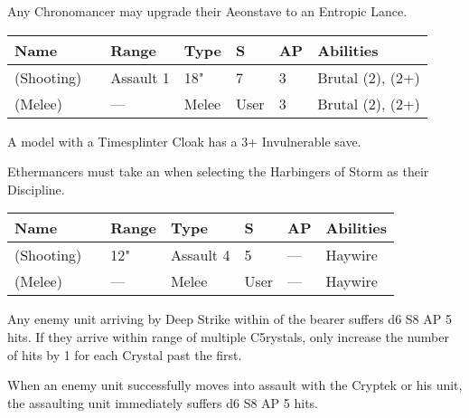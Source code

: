  \label{Entropic Lance}

Any Chronomancer may upgrade their Aeonstave to an Entropic Lance.

\noindent
\begin{tabular}{||m{130pt} m{10pt} m{31pt} m{55pt} m{12pt} m{12pt} m{210pt}||}
	\hline
	Name & & Range & Type & S & AP & Abilities \\
	\hline
	\quickref{Entropic Lance} (Shooting) & & Assault 1 & 18" & 7 & 3 & Brutal (2), \quickref{Entropic Strike} (2+) \\
	\quickref{Entropic Lance} (Melee) & & — & Melee & User & 3 & Brutal (2), \quickref{Entropic Strike} (2+) \\
	\hline
\end{tabular}


A model with a Timesplinter Cloak has a 3+ Invulnerable save.




Ethermancers must take an  when selecting the Harbingers of Storm as their Discipline.

\label{Voltaic Staff}
\noindent
\begin{tabular}{||m{130pt} m{10pt} m{31pt} m{55pt} m{12pt} m{12pt} m{210pt}||}
	\hline
	Name & & Range & Type & S & AP & Abilities \\
	\hline
	\quickref{Voltaic Staff} (Shooting) & & 12" & Assault 4 & 5 & — & Haywire \\
	\quickref{Voltaic Staff} (Melee) & & — & Melee & User & — & Haywire \\
	\hline
\end{tabular}


Any enemy unit arriving by Deep Strike within  of the bearer suffers d6 S8 AP 5 hits. If they arrive within range of multiple C5rystals, only increase the number of hits by 1 for each Crystal past the first.


When an enemy unit successfully moves into assault with the Cryptek or his unit, the assaulting unit immediately suffers d6 S8 AP 5 hits.




